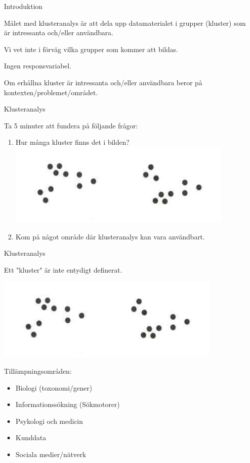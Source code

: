 \documentclass[10pt,english]{beamer}
\begin{document}
\begin{frame}{Introduktion}
    \begin{greenbox}
        Målet med klusteranalys är att dela upp datamaterialet i grupper (kluster) som är intressanta och/eller användbara.
    \end{greenbox}

    Vi vet inte i förväg vilka grupper som kommer att bildas.

    Ingen responsvariabel.
    
    Om erhållna kluster är intressanta och/eller användbara beror på kontexten/problemet/området.
    
    
\end{frame}

\begin{frame}{Klusteranalys}

    Ta 5 minuter att fundera på följande frågor:

    \begin{enumerate}
        \item Hur många kluster finns det i bilden?
        \includegraphics[width = .7\textwidth]{figs/kluster1.png}
        \item Kom på något område där klusteranalys kan vara användbart.
    \end{enumerate}
    
\end{frame}

\begin{frame}{Klusteranalys}
    
    Ett "kluster" är inte entydigt definerat.

    \includegraphics[width = .7\textwidth]{figs/kluster1.png}

    Tillämpningsområden:
    \begin{itemize}
        \item Biologi (toxonomi/gener)
        \item Informationssökning (Sökmotorer)
        \item Psykologi och medicin
        \item Kunddata
        \item Sociala medier/nätverk
    \end{itemize}

\end{frame}
\end{document}
